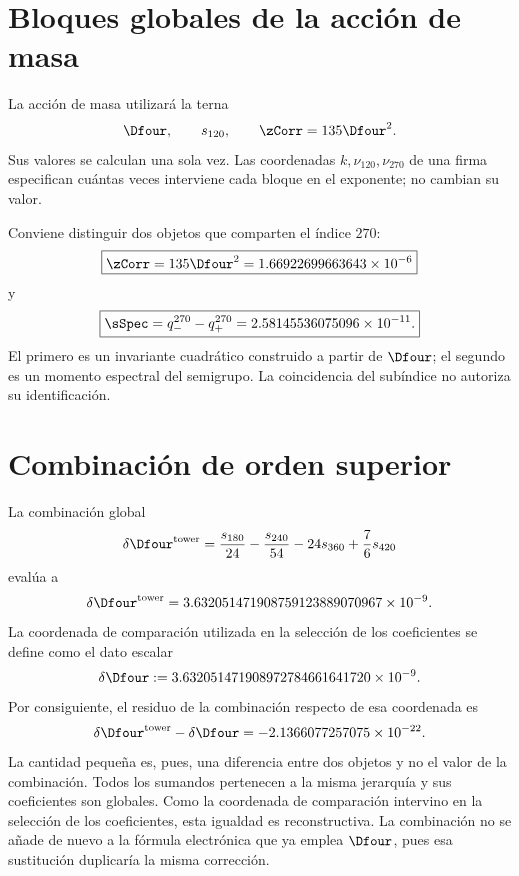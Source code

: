 \section{Bloques globales de la acción de masa}

La acción de masa utilizará la terna
\[
 \Dfour,\qquad s_{120},\qquad \zCorr=135\Dfour^2.
\]
Sus valores se calculan una sola vez. Las coordenadas
\(k,\nu_{120},\nu_{270}\) de una firma especifican cuántas veces interviene
cada bloque en el exponente; no cambian su valor.

Conviene distinguir dos objetos que comparten el índice \(270\):
\[
 \boxed{\zCorr=135\Dfour^2
 =1.66922699663643\times10^{-6}}
\]
y
\[
 \boxed{\sSpec=q_-^{270}-q_+^{270}
 =2.58145536075096\times10^{-11}.}
\]
El primero es un invariante cuadrático construido a partir de \(\Dfour\); el
segundo es un momento espectral del semigrupo. La coincidencia del subíndice no
autoriza su identificación.

\section{Combinación de orden superior}

La combinación global
\[
 \delta\Dfour^{\rm tower}
 =\frac{s_{180}}{24}-\frac{s_{240}}{54}
 -24s_{360}+\frac76s_{420}
\]
evalúa a
\[
 \delta\Dfour^{\rm tower}
 =3.632051471908759123889070967\times10^{-9}.
\]
La coordenada de comparación utilizada en la selección de los
coeficientes se define como el dato escalar
\[
 \delta\Dfour
 :=3.632051471908972784661641720\times10^{-9}.
\]
Por consiguiente, el residuo de la combinación respecto de esa coordenada es
\[
 \delta\Dfour^{\rm tower}-\delta\Dfour
 =-2.1366077257075\times10^{-22}.
\]
La cantidad pequeña es, pues, una diferencia entre dos objetos y no el valor
de la combinación. Todos los sumandos pertenecen a la misma jerarquía y sus
coeficientes son globales. Como la coordenada de comparación intervino en la
selección de los coeficientes, esta igualdad es reconstructiva. La
combinación no se añade de nuevo a la fórmula electrónica que ya emplea
\(\Dfour\), pues esa sustitución duplicaría la misma corrección.

